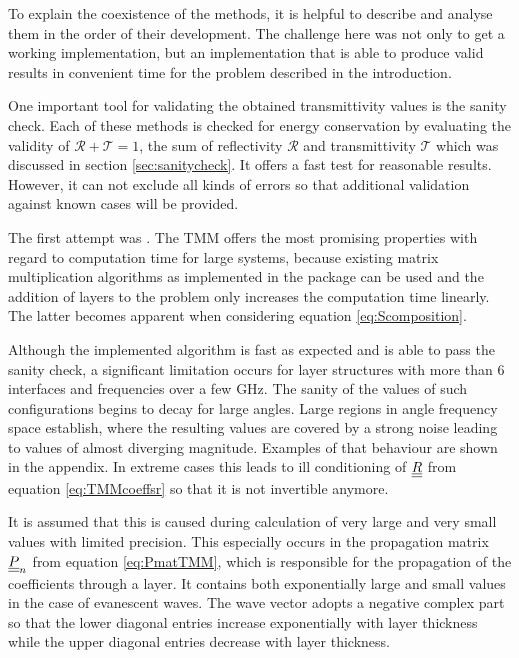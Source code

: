 To explain the coexistence of the methods, it is helpful to describe and
analyse them in the order of their development. The challenge here was not only
to get a working implementation, but an implementation that is able to produce
valid results in convenient time for the problem described in the introduction.

One important tool for validating the obtained transmittivity values is the
sanity check. Each of these methods is checked for energy conservation by
evaluating the
validity of $\mathcal{R}+\mathcal{T}=1$, the sum of reflectivity $\mathcal{R}$
and transmittivity $\mathcal{T}$ which was discussed in section
\ref{sec:sanitycheck}. It offers a fast test for reasonable
results. However, it can not exclude all kinds of errors so that additional
validation against known cases will be provided.

The first attempt was . The TMM offers the most promising
properties with regard to computation time for large systems, because existing
matrix multiplication algorithms as implemented in the  package can
be used and the addition of layers to the problem only increases the
computation time linearly. The latter becomes apparent when considering
equation \ref{eq:Scomposition}.

Although the implemented algorithm is fast as expected and is able to pass the
sanity check, a significant limitation occurs for layer structures with more
than 6 interfaces and frequencies over a few GHz. The sanity of the values of
such configurations begins to decay for large angles. Large regions in angle
frequency space establish, where the resulting values are covered by a strong
noise leading to values of almost diverging magnitude.	Examples of that
behaviour are shown in the appendix. In extreme cases this
leads to ill conditioning of $\underline{\underline{R}}$ from equation \ref{eq:TMMcoeffsr} so
that it is not invertible anymore.

It is assumed that this is caused during calculation of very large and very
small values with limited precision.
This especially occurs in the propagation matrix $\underline{\underline{P}}_n$ from equation
\ref{eq:PmatTMM}, which is
responsible for the propagation of the coefficients through a layer. It
contains both exponentially large and small
values in the case of evanescent waves. The wave vector adopts
a negative complex part so that the lower diagonal entries increase
exponentially with layer thickness while the upper diagonal entries decrease
with layer thickness.


